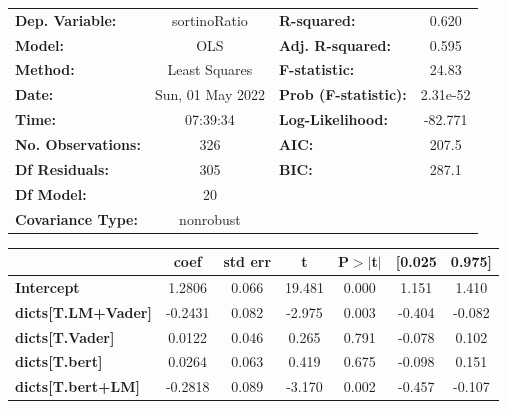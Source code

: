 \begin{center}
\begin{tabular}{lclc}
\toprule
\textbf{Dep. Variable:}              &   sortinoRatio   & \textbf{  R-squared:         } &     0.620   \\
\textbf{Model:}                      &       OLS        & \textbf{  Adj. R-squared:    } &     0.595   \\
\textbf{Method:}                     &  Least Squares   & \textbf{  F-statistic:       } &     24.83   \\
\textbf{Date:}                       & Sun, 01 May 2022 & \textbf{  Prob (F-statistic):} &  2.31e-52   \\
\textbf{Time:}                       &     07:39:34     & \textbf{  Log-Likelihood:    } &   -82.771   \\
\textbf{No. Observations:}           &         326      & \textbf{  AIC:               } &     207.5   \\
\textbf{Df Residuals:}               &         305      & \textbf{  BIC:               } &     287.1   \\
\textbf{Df Model:}                   &          20      & \textbf{                     } &             \\
\textbf{Covariance Type:}            &    nonrobust     & \textbf{                     } &             \\
\bottomrule
\end{tabular}
\begin{tabular}{lcccccc}
                                     & \textbf{coef} & \textbf{std err} & \textbf{t} & \textbf{P$> |$t$|$} & \textbf{[0.025} & \textbf{0.975]}  \\
\midrule
\textbf{Intercept}                   &       1.2806  &        0.066     &    19.481  &         0.000        &        1.151    &        1.410     \\
\textbf{dicts[T.LM+Vader]}           &      -0.2431  &        0.082     &    -2.975  &         0.003        &       -0.404    &       -0.082     \\
\textbf{dicts[T.Vader]}              &       0.0122  &        0.046     &     0.265  &         0.791        &       -0.078    &        0.102     \\
\textbf{dicts[T.bert]}               &       0.0264  &        0.063     &     0.419  &         0.675        &       -0.098    &        0.151     \\
\textbf{dicts[T.bert+LM]}            &      -0.2818  &        0.089     &    -3.170  &         0.002        &       -0.457    &       -0.107     \\

\end{tabular}
\end{center}
